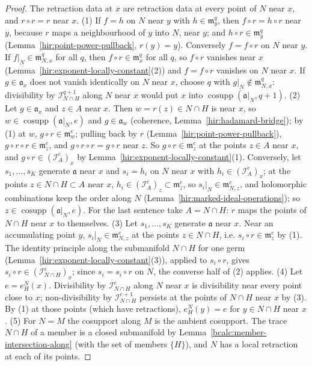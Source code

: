 \begin{proof}
\leanok
The retraction data at \(x\) are retraction data at every point of \(N\) near \(x\), and \(r\circ r=r\) near \(x\).
(1) If \(f=h\) on \(N\) near \(y\) with \(h\in\mathfrak m_y^q\), then \(f\circ r=h\circ r\) near \(y\), because \(r\) maps a neighbourhood of \(y\) into \(N\), near
\(y\); and \(h\circ r\in\mathfrak m_y^q\) (Lemma~\ref{hir:point-power-pullback}, \(r(y)=y\)). Conversely \(f=f\circ r\) on \(N\) near \(y\). If
\(f|_N\in\mathfrak m_{N,x}^q\) for all \(q\), then \(f\circ r\in\mathfrak m_x^q\) for all \(q\), so \(f\circ r\) vanishes near \(x\)
(Lemma~\ref{hir:exponent-locally-constant}(2)) and \(f=f\circ r\) vanishes on \(N\) near \(x\). If \(g\in\mathfrak a_x\) does not vanish identically on \(N\) near
\(x\), choose \(q\) with \(g|_N\notin\mathfrak m_{N,x}^q\): divisibility by \(\mathcal I_{N\cap H}^{q+1}\) along \(N\) near \(x\) would put \(x\) into
\(\operatorname{cosupp}(\mathfrak a|_N,q+1)\).
(2) Let \(g\in\mathfrak a_x\) and \(z\in A\) near \(x\). Then \(w=r(z)\in N\cap H\) is near \(x\), so \(w\in\operatorname{cosupp}(\mathfrak a|_N,e)\) and
\(g\in\mathfrak a_w\) (coherence, Lemma~\ref{hir:hadamard-bridge}); by (1) at \(w\), \(g\circ r\in\mathfrak m_w^e\); pulling back by \(r\)
(Lemma~\ref{hir:point-power-pullback}), \(g\circ r\circ r\in\mathfrak m_z^e\), and \(g\circ r\circ r=g\circ r\) near \(z\). So \(g\circ r\in\mathfrak m_z^e\) at the
points \(z\in A\) near \(x\), and \(g\circ r\in(\mathcal I_A^e)_x\) by Lemma~\ref{hir:exponent-locally-constant}(1). Conversely, let \(s_1,\dots,s_K\) generate
\(\mathfrak a\) near \(x\) and \(s_i=h_i\) on \(N\) near \(x\) with \(h_i\in(\mathcal I_A^e)_x\); at the points \(z\in N\cap H\subset A\) near \(x\),
\(h_i\in(\mathcal I_A^e)_z\subset\mathfrak m_z^e\), so \(s_i|_N\in\mathfrak m_{N,z}^e\), and holomorphic combinations keep the order along \(N\)
(Lemma~\ref{hir:marked-ideal-operations}); so \(z\in\operatorname{cosupp}(\mathfrak a|_N,e)\). For the last sentence take \(A=N\cap H\): \(r\) maps the points of
\(N\cap H\) near \(x\) to themselves.
(3) Let \(s_1,\dots,s_K\) generate \(\mathfrak a\) near \(x\). Near an accumulating point \(y\), \(s_i|_N\in\mathfrak m_{N,z}^e\) at the points \(z\in N\cap H\), i.e.
\(s_i\circ r\in\mathfrak m_z^e\) by (1). The identity principle along the submanifold \(N\cap H\) for one germ (Lemma~\ref{hir:exponent-locally-constant}(3)),
applied to \(s_i\circ r\), gives \(s_i\circ r\in(\mathcal I_{N\cap H}^e)_x\); since \(s_i=s_i\circ r\) on \(N\), the converse half of (2) applies.
(4) Let \(e=e^N_H(x)\). Divisibility by \(\mathcal I_{N\cap H}^e\) along \(N\) near \(x\) is divisibility near every point close to \(x\); non-divisibility by
\(\mathcal I_{N\cap H}^{e+1}\) persists at the points of \(N\cap H\) near \(x\) by (3). By (1) at those points (which have retractions),
\(e^N_H(y)=e\) for \(y\in N\cap H\) near \(x\).
(5) For \(N=M\) the cosupport along \(M\) is the ambient cosupport. The trace \(N\cap H\) of a member is a closed submanifold by
Lemma~\ref{bcalc:member-intersection-along} (with the set of members \(\{H\}\)), and \(N\) has a local retraction at each of its points.
\end{proof}
